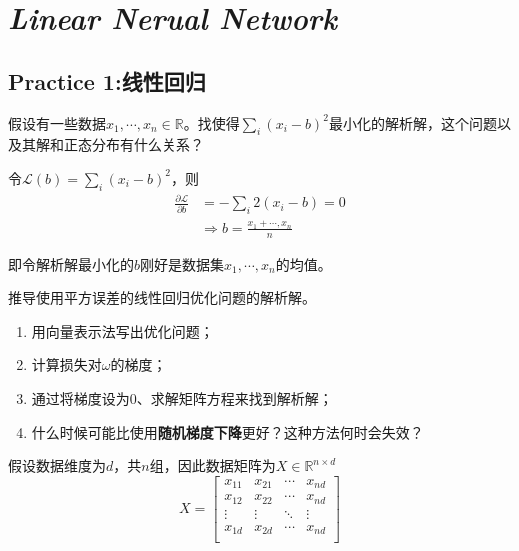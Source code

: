 \chapter{\textsl{Linear Nerual Network}}

\section{Practice 1:线性回归}

\begin{mdframed}
    \begin{question}
        假设有一些数据$x_1,\cdots,x_n\in \mathbb{R}$。找使得$\sum_{i}(x_i-b)^2$最小化的解析解，这个问题以及其解和正态分布有什么关系？
    \end{question}
\end{mdframed}

令$\mathcal{L}(b)=\sum_{i}(x_i-b)^2$，则
\begin{equation}
    \begin{aligned}
        \frac{\partial \mathcal{L}}{\partial b}&=-\sum_{i} 2(x_i-b)=0\\
        &\Rightarrow b=\frac{x_1+\cdots,x_n}{n}
    \end{aligned}
\end{equation}

即令解析解最小化的$b$刚好是数据集$x_1,\cdots,x_n$的均值。

\begin{mdframed}
    \begin{question}
        推导使用平方误差的线性回归优化问题的解析解。
        \begin{enumerate}[itemindent=2em]
            \item 用向量表示法写出优化问题；
            \item 计算损失对$\omega$的梯度；
            \item 通过将梯度设为$0$、求解矩阵方程来找到解析解；
            \item 什么时候可能比使用\textbf{随机梯度下降}更好？这种方法何时会失效？
        \end{enumerate}
    \end{question}
\end{mdframed}

假设数据维度为$d$，共$n$组，因此数据矩阵为$X\in \mathbb{R}^{n\times d}$
\begin{equation}
    X=\left[\begin{array}{ccccc}
        x_{11} & x_{21} & \cdots & x_{nd} \\
        x_{12} & x_{22} & \cdots & x_{nd} \\
        \vdots & \vdots & \ddots & \vdots \\
        x_{1d} & x_{2d} & \cdots & x_{nd} \\
    \end{array}\right]
\end{equation}

